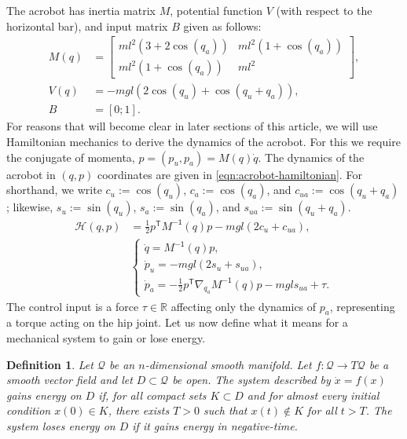 \documentclass[journal,twoside,web, twocolumn,draftcls]{ieeecolor}
\newtheorem{defn}{Definition} %
\newcommand*{\tpose}{^\mathsf{T}}
\newcommand*{\R}{\mathbb{R}}
\newcommand*{\Minv}{M^\mathsf{-1}}
\begin{document}
The acrobot has inertia matrix 
\(M\), potential function \(V\) (with respect to
the horizontal bar), and input matrix \(B\) given as follows:
\begin{align}\label{eqn:acrobot-inertia}
    M(q) &= \begin{bmatrix}
        ml^2\left(3+2\cos(q_a)\right) & 
        ml^2\left(1+\cos(q_a)\right) \\
        ml^2\left(1+\cos(q_a)\right) &
        ml^2
    \end{bmatrix} 
    , \\
    \label{eqn:acrobot-potential}
    V(q) &= -mgl\left(2\cos(q_u)+\cos(q_u+q_a)\right)
    , \\
    \label{eqn:acrobot-B}
    B &= [0;1]
    .
\end{align}
For reasons that will become clear in later sections of this article, we will
use Hamiltonian mechanics to derive the dynamics of the acrobot. 
For this we require the conjugate of momenta, \(p = (p_u,p_a) = M(q)\dot{q}\).
The dynamics of the acrobot in \((q,p)\) coordinates are given in
\eqref{eqn:acrobot-hamiltonian}.
For shorthand, we write \(c_u := \cos(q_u)\), \(c_a := \cos(q_a)\), and 
\(c_{ua} := \cos(q_u + q_a)\); likewise, \(s_u := \sin(q_u)\), 
\(s_a := \sin(q_a)\), and \(s_{ua} := \sin(q_u + q_a)\).
\begin{align}\label{eqn:acrobot-hamiltonian}
    \mathcal{H}(q,p) &= \frac{1}{2}p\tpose \Minv(q) p -
    mgl\left(2 c_u + c_{ua}\right)
    , \\
     &\begin{cases}
        \dot{q} = \Minv(q) p 
        ,\\
        \dot{p}_u = -mgl\left(2s_u + s_{ua}\right) 
        ,\\
        \dot{p}_a =-\frac{1}{2}p\tpose \nabla_{q_a}\Minv(q) p
        - mgl s_{ua} + \tau.
    \end{cases} \nonumber
\end{align}
The control input is a force \(\tau \in \R\) affecting only the dynamics of
\(p_a\), representing a torque acting on the hip joint.
Let us now define what it means for a mechanical system to gain or lose energy.

\begin{defn}\label{defn:energy-gain}
    Let \(\mathcal{Q}\) be an
    \(n\)-dimensional smooth manifold. 
    Let \(f : \mathcal{Q} \rightarrow T\mathcal{Q}\) be a smooth vector
    field and let \(D \subset \mathcal{Q}\) be open.
    The system described by \(\dot{x} = f(x)\) 
    \textit{gains energy on \(D\)} if, 
    for all compact sets \(K \subset D\) and for almost every initial
    condition \(x(0) \in K\), there exists \(T > 0\) such
    that \(x(t) \notin K\) for all \(t > T\).
    The system \textit{loses energy on \(D\)} if it gains energy in
    negative-time.
\end{defn}
\end{document}

